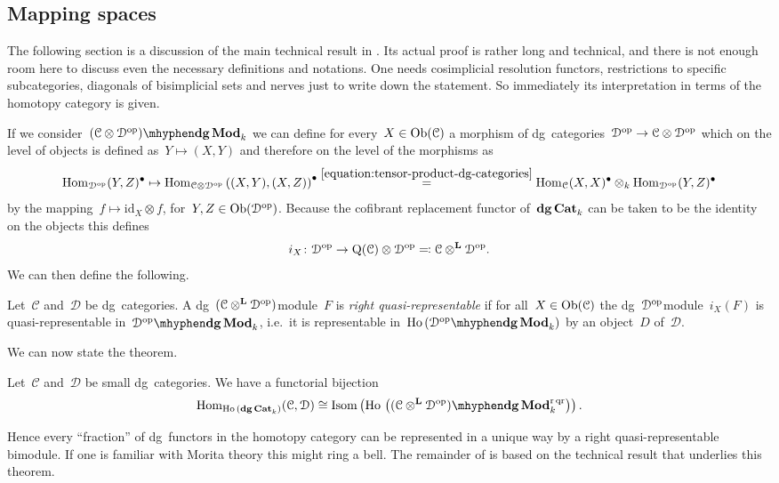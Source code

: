 \begin{refsection}
\section{Mapping spaces}
The following section is a discussion of the main technical result in \cite{toen}. Its actual proof is rather long and technical, and there is not enough room here to discuss even the necessary definitions and notations. One needs cosimplicial resolution functors, restrictions to specific subcategories, diagonals of bisimplicial sets and nerves just to write down the statement. So immediately its interpretation in terms of the homotopy category is given.

If we consider~$\dgMod{(\mathcal{C}\otimes\mathcal{D}^\opp)}_k$ we can define for every~$X\in\operatorname{Ob}(\mathcal{C})$ a morphism of dg~categories~$\mathcal{D}^{\mathrm{op}}\to\mathcal{C}\otimes\mathcal{D}^{\mathrm{op}}$ which on the level of objects is defined as~$Y\mapsto(X,Y)$ and therefore on the level of the morphisms as
\begin{equation}
  \mathrm{Hom}_{\mathcal{D}^{\mathrm{op}}}(Y,Z)^\bullet\mapsto\mathrm{Hom}_{\mathcal{C}\otimes\mathcal{D}^{\mathrm{op}}}\left( (X,Y),(X,Z) \right)^\bullet\overset{\eqref{equation:tensor-product-dg-categories}}{=}\mathrm{Hom}_{\mathcal{C}}(X,X)^\bullet\otimes_k\mathrm{Hom}_{\mathcal{D}^{\mathrm{op}}}(Y,Z)^\bullet
\end{equation}
by the mapping~$f\mapsto\mathrm{id}_X\otimes f$, for~$Y,Z\in\operatorname{Ob}(\mathcal{D}^{\mathrm{op}})$. Because the cofibrant replacement functor of~$\mathbf{dg\,Cat}_k$ can be taken to be the identity on the objects \cite[proposition 2.3]{toen} this defines
\begin{equation}
  i_X\colon\mathcal{D}^{\mathrm{op}}\to\operatorname{Q}(\mathcal{C})\otimes\mathcal{D}^{\mathrm{op}}\eqqcolon\mathcal{C}\otimes^{\mathbf{L}}\mathcal{D}^{\mathrm{op}}.
\end{equation}
We can then define the following.
\begin{definition}
  Let~$\mathcal{C}$ and~$\mathcal{D}$ be dg~categories. A dg~$(\mathcal{C}\otimes^{\mathbf{L}}\mathcal{D}^{\mathrm{op}})$\dash module~$F$ is \emph{right quasi-representable} if for all~$X\in\operatorname{Ob}(\mathcal{C})$ the dg~$\mathcal{D}^{\mathrm{op}}$\dash module~$i_X(F)$ is quasi-representable in~$\dgMod{\mathcal{D}^\opp}_k$, i.e.\ it is representable in~$\Ho(\dgMod{\mathcal{D}^\opp}_k)$ by an object~$D$ of~$\mathcal{D}$.
\end{definition}
We can now state the theorem.
\begin{theorem}
  \label{theorem:fundamental-bijection}
  Let~$\mathcal{C}$ and~$\mathcal{D}$ be small dg~categories. We have a functorial bijection
  \begin{equation}
    \label{equation:fundamental-bijection}
    \Hom_{\Ho(\dgCat_k)}(\mathcal{C},\mathcal{D})\cong\Isom\left( \Ho\left( \dgMod{(\mathcal{C}\LLLotimes\mathcal{D}^\opp)}_k^\rqr \right) \right).
  \end{equation}
\end{theorem}
Hence every ``fraction'' of dg~functors in the homotopy category can be represented in a unique way by a right quasi-representable bimodule. If one is familiar with Morita theory this might ring a bell. The remainder of \cite{toen} is based on the technical result that underlies this theorem.  



\end{refsection}
